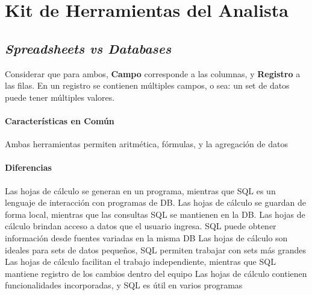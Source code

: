 
\section {Kit de Herramientas del Analista}


\subsection{\textit{Spreadsheets vs Databases}}
Considerar que para ambos, \textbf{Campo} corresponde a las columnas, y \textbf{Registro} a las filas. En un registro se contienen múltiples campos, o sea: un set de datos puede tener múltiples valores.

\paragraph{Características en Común}
Ambas herramientas permiten aritmética, fórmulas, y la agregación de datos

\paragraph{Diferencias}
Las hojas de cálculo se generan en un programa, mientras que SQL es un lenguaje de interacción con programas de DB.
Las hojas de cálculo se guardan de forma local, mientras que las consultas SQL se mantienen en la DB.
Las hojas de cálculo brindan acceso a datos que el usuario ingresa. SQL puede obtener información desde fuentes variadas en la misma DB
Las hojas de cálculo son ideales para sets de datos pequeños, SQL permiten trabajar con sets más grandes
Las hojas de cálculo facilitan el trabajo independiente, mientras que SQL mantiene registro de los cambios dentro del equipo
Las hojas de cálculo contienen funcionalidades incorporadas, y SQL es útil en varios programas


